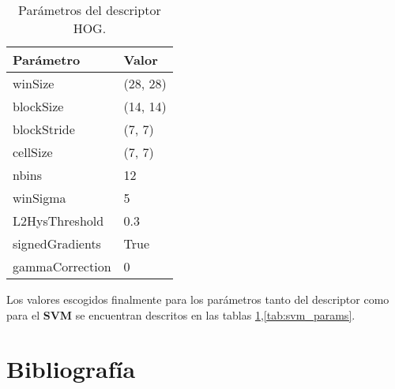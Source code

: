 \documentclass[12pt,letterpaper]{article}
\begin{document}
\begin{table}[htp]
    \centering
    \begin{tabular}{ll}
    \hline
    \textbf{Parámetro} & \textbf{Valor} \\
    \hline
    winSize & (28, 28) \\
    blockSize & (14, 14) \\
    blockStride & (7, 7) \\
    cellSize & (7, 7) \\
    nbins & 12 \\
    winSigma & 5 \\
    L2HysThreshold & 0.3 \\
    signedGradients & True \\
    gammaCorrection & 0 \\
    \hline
    \end{tabular}
    \caption{Parámetros del descriptor HOG.}
    \label{tab:hog_params}
\end{table}

Los valores escogidos finalmente para los parámetros tanto del descriptor como para el \textbf{SVM} se encuentran descritos en las tablas \ref{tab:hog_params},\ref{tab:svm_params}.

\newpage
\section{Bibliografía}

\printbibliography[heading=none, category=cited]
\end{document}
